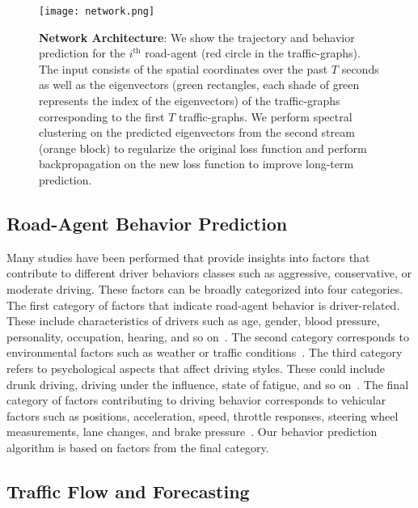 \documentclass[10pt,twocolumn,letterpaper]{article}
\theoremstyle{plain}
\begin{document}
\begin{figure*}[t]
    \centering
    \texttt{[image: network.png]}
    \caption{\textbf{Network Architecture}: We show the trajectory and behavior prediction for the $i^{\textrm{th}}$ road-agent (red circle in the traffic-graphs). The input consists of the spatial coordinates over the past $T$ seconds as well as the eigenvectors (green rectangles, each shade of green represents the index of the eigenvectors) of the traffic-graphs corresponding to the first $T$ traffic-graphs. We perform spectral clustering on the predicted eigenvectors from the second stream (orange block) to regularize the original loss function and perform backpropagation on the new loss function to improve long-term prediction.}
    \label{fig:network}
    \vspace{-10pt}
\end{figure*}

\subsection{Road-Agent Behavior Prediction}

Many studies have been performed that provide insights into factors that contribute to different driver behaviors classes such as aggressive, conservative, or moderate driving. These factors can be broadly categorized into four categories. The first category of factors that indicate road-agent behavior is driver-related. These include characteristics of drivers such as age, gender, blood pressure, personality, occupation, hearing, and so on~\cite{ernestref2, rohanref3, rohanref5, big5, ernestref9, ernestref10}. 
The second category corresponds to environmental factors such as weather or traffic conditions~\cite{behaviorref-category2-1,behaviorref-category2-2}.
The third category refers to psychological aspects that affect driving styles. These could include drunk driving, driving under the influence, state of fatigue, and so on~\cite{behaviorref-category3-2,behaviorref-category3-1}.
The final category of factors contributing to driving behavior corresponds to vehicular factors such as positions, acceleration, speed, throttle responses, steering wheel measurements, lane changes, and brake pressure~\cite{ernestref8,ernestref12, ernestref13,ernestref14,ernestref15, ernest, chandra2019graphrqi}. Our behavior prediction algorithm is based on factors from the final category.




\subsection{Traffic Flow and Forecasting}
\end{document}
